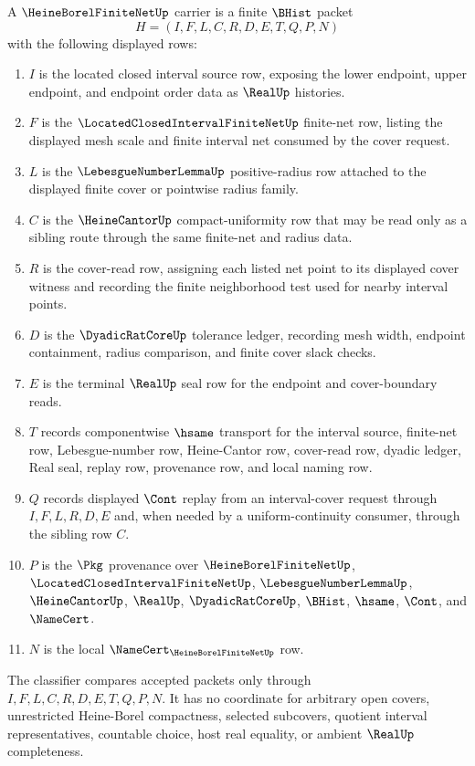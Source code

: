 \begin{definition}
\label{def:heine-borel-finite-net-carrier}
A $\HeineBorelFiniteNetUp$ carrier is a finite $\BHist$ packet
$$
H=(I,F,L,C,R,D,E,T,Q,P,N)
$$
with the following displayed rows:
\begin{enumerate}
\item $I$ is the located closed interval source row, exposing the lower endpoint, upper endpoint, and endpoint order data as $\RealUp$ histories.
\item $F$ is the $\LocatedClosedIntervalFiniteNetUp$ finite-net row, listing the displayed mesh scale and finite interval net consumed by the cover request.
\item $L$ is the $\LebesgueNumberLemmaUp$ positive-radius row attached to the displayed finite cover or pointwise radius family.
\item $C$ is the $\HeineCantorUp$ compact-uniformity row that may be read only as a sibling route through the same finite-net and radius data.
\item $R$ is the cover-read row, assigning each listed net point to its displayed cover witness and recording the finite neighborhood test used for nearby interval points.
\item $D$ is the $\DyadicRatCoreUp$ tolerance ledger, recording mesh width, endpoint containment, radius comparison, and finite cover slack checks.
\item $E$ is the terminal $\RealUp$ seal row for the endpoint and cover-boundary reads.
\item $T$ records componentwise $\hsame$ transport for the interval source, finite-net row, Lebesgue-number row, Heine-Cantor row, cover-read row, dyadic ledger, Real seal, replay row, provenance row, and local naming row.
\item $Q$ records displayed $\Cont$ replay from an interval-cover request through $I,F,L,R,D,E$ and, when needed by a uniform-continuity consumer, through the sibling row $C$.
\item $P$ is the $\Pkg$ provenance over $\HeineBorelFiniteNetUp$, $\LocatedClosedIntervalFiniteNetUp$, $\LebesgueNumberLemmaUp$, $\HeineCantorUp$, $\RealUp$, $\DyadicRatCoreUp$, $\BHist$, $\hsame$, $\Cont$, and $\NameCert$.
\item $N$ is the local $\NameCert_{\HeineBorelFiniteNetUp}$ row.
\end{enumerate}
The classifier compares accepted packets only through $I,F,L,C,R,D,E,T,Q,P,N$. It has no coordinate for arbitrary open covers, unrestricted Heine-Borel compactness, selected subcovers, quotient interval representatives, countable choice, host real equality, or ambient $\RealUp$ completeness.
\end{definition}

